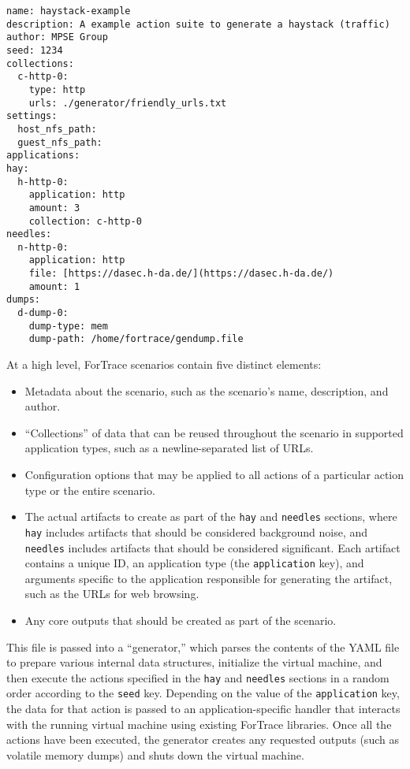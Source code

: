 \documentclass[letterpaper,12pt]{report}
\def\tightlist{}
\newcommand{\passthrough}[1]{#1}
\begin{document}
\begin{lstlisting}
name: haystack-example
description: A example action suite to generate a haystack (traffic)
author: MPSE Group
seed: 1234
collections:
  c-http-0:
    type: http
    urls: ./generator/friendly_urls.txt
settings:
  host_nfs_path:
  guest_nfs_path:
applications:
hay:
  h-http-0:
    application: http
    amount: 3
    collection: c-http-0
needles:
  n-http-0:
    application: http
    file: [https://dasec.h-da.de/](https://dasec.h-da.de/)
    amount: 1
dumps:
  d-dump-0:
    dump-type: mem
    dump-path: /home/fortrace/gendump.file
\end{lstlisting}

At a high level, ForTrace scenarios contain five distinct elements:

\begin{itemize}
\tightlist
\item
  Metadata about the scenario, such as the scenario's name, description,
  and author.
\item
  ``Collections'' of data that can be reused throughout the scenario in
  supported application types, such as a newline-separated list of URLs.
\item
  Configuration options that may be applied to all actions of a
  particular action type or the entire scenario.
\item
  The actual artifacts to create as part of the
  \passthrough{\lstinline!hay!} and \passthrough{\lstinline!needles!}
  sections, where \passthrough{\lstinline!hay!} includes artifacts that
  should be considered background noise, and
  \passthrough{\lstinline!needles!} includes artifacts that should be
  considered significant. Each artifact contains a unique ID, an
  application type (the \passthrough{\lstinline!application!} key), and
  arguments specific to the application responsible for generating the
  artifact, such as the URLs for web browsing.
\item
  Any core outputs that should be created as part of the scenario.
\end{itemize}

This file is passed into a ``generator,'' which parses the contents of
the YAML file to prepare various internal data structures, initialize
the virtual machine, and then execute the actions specified in the
\passthrough{\lstinline!hay!} and \passthrough{\lstinline!needles!}
sections in a random order according to the
\passthrough{\lstinline!seed!} key. Depending on the value of the
\passthrough{\lstinline!application!} key, the data for that action is
passed to an application-specific handler that interacts with the
running virtual machine using existing ForTrace libraries. Once all the
actions have been executed, the generator creates any requested outputs
(such as volatile memory dumps) and shuts down the virtual machine.
\end{document}
